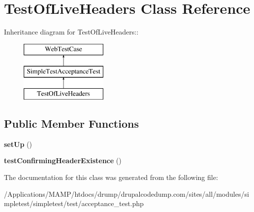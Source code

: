 \hypertarget{class_test_of_live_headers}{
\section{TestOfLiveHeaders Class Reference}
\label{class_test_of_live_headers}
}
Inheritance diagram for TestOfLiveHeaders::\begin{figure}[H]
\begin{center}
\leavevmode
\includegraphics[height=3cm]{class_test_of_live_headers}
\end{center}
\end{figure}
\subsection*{Public Member Functions}
\begin{DoxyCompactItemize}
\item 
\hypertarget{class_test_of_live_headers_a2bdeb2a1f9de903b2aa52bccbc74eaa5}{
{\bfseries setUp} ()}
\label{class_test_of_live_headers_a2bdeb2a1f9de903b2aa52bccbc74eaa5}

\item 
\hypertarget{class_test_of_live_headers_acb1bc2461c8d5f3ff8163faca6734957}{
{\bfseries testConfirmingHeaderExistence} ()}
\label{class_test_of_live_headers_acb1bc2461c8d5f3ff8163faca6734957}

\end{DoxyCompactItemize}


The documentation for this class was generated from the following file:\begin{DoxyCompactItemize}
\item 
/Applications/MAMP/htdocs/drump/drupalcodedump.com/sites/all/modules/simpletest/simpletest/test/acceptance\_\-test.php\end{DoxyCompactItemize}
